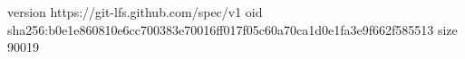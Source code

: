 version https://git-lfs.github.com/spec/v1
oid sha256:b0e1e860810e6cc700383e70016ff017f05c60a70ca1d0e1fa3e9f662f585513
size 90019
